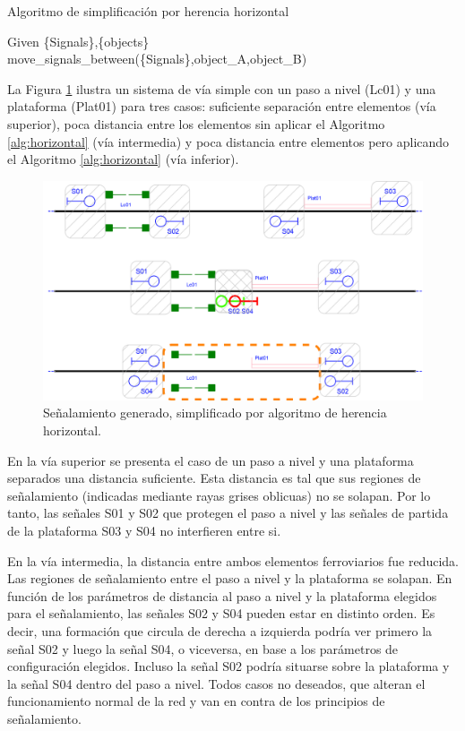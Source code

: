 \begin{algorithm}[hbt!]
	\caption{Algoritmo de simplificación por herencia horizontal}
	\label{alg:horizontal}
	\DontPrintSemicolon
	\SetNoFillComment
	\LinesNotNumbered 
	Given \{Signals\},\{objects\}\\
	{
		{
			{
				{
					move\_signals\_between(\{Signals\},object\_A,object\_B)
				}
			}
		}
	}
\end{algorithm}

La Figura \ref{fig:signal_horizontal} ilustra un sistema de vía simple con un paso a nivel (Lc01) y una plataforma (Plat01) para tres casos: suficiente separación entre elementos (vía superior), poca distancia entre los elementos sin aplicar el Algoritmo \ref{alg:horizontal} (vía intermedia) y poca distancia entre elementos pero aplicando el Algoritmo \ref{alg:horizontal} (vía inferior).

\begin{figure}[h!]
	\centering
	\includegraphics[width=1\textwidth]{Figuras/proximity.PNG}
	\centering\caption{Señalamiento generado, simplificado por algoritmo de herencia horizontal.}
	\label{fig:signal_horizontal}
\end{figure}

En la vía superior se presenta el caso de un paso a nivel y una plataforma separados una distancia suficiente. Esta distancia es tal que sus regiones de señalamiento (indicadas mediante rayas grises oblicuas) no se solapan. Por lo tanto, las señales S01 y S02 que protegen el paso a nivel y las señales de partida de la plataforma S03 y S04 no interfieren entre si.

En la vía intermedia, la distancia entre ambos elementos ferroviarios fue reducida. Las regiones de señalamiento entre el paso a nivel y la plataforma se solapan. En función de los parámetros de distancia al paso a nivel y la plataforma elegidos para el señalamiento, las señales S02 y S04 pueden estar en distinto orden. Es decir, una formación que circula de derecha a izquierda podría ver primero la señal S02 y luego la señal S04, o viceversa, en base a los parámetros de configuración elegidos. Incluso la señal S02 podría situarse sobre la plataforma y la señal S04 dentro del paso a nivel. Todos casos no deseados, que alteran el funcionamiento normal de la red y van en contra de los principios de señalamiento.

